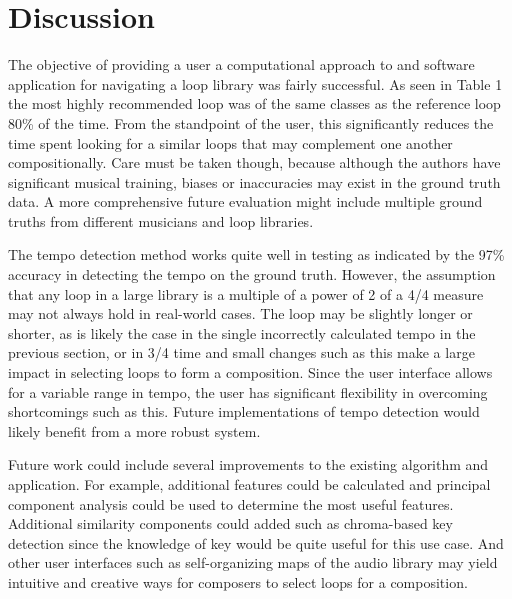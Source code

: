 \documentclass{article}
\begin{document}
\section{Discussion}

The objective of providing a user a computational approach to and software application for navigating a loop library was fairly successful. As seen in Table 1 the most highly recommended loop was of the same classes as the reference loop 80\% of the time. From the standpoint of the user, this significantly reduces the time spent looking for a similar loops that may complement one another compositionally. Care must be taken though, because although the authors have significant musical training, biases or inaccuracies may exist in the ground truth data. A more comprehensive future evaluation might include multiple ground truths from different musicians and loop libraries.

The tempo detection method works quite well in testing as indicated by the 97\% accuracy in detecting the tempo on the ground truth. However, the assumption that any loop in a large library is a multiple of a power of 2 of a 4/4 measure may not always hold in real-world cases. The loop may be slightly longer or shorter, as is likely the case in the single incorrectly calculated tempo in the previous section, or in 3/4 time and small changes such as this make a large impact in selecting loops to form a composition. Since the user interface allows for a variable range in tempo, the user has significant flexibility in overcoming shortcomings such as this. Future implementations of tempo detection would likely benefit from a more robust system.

Future work could include several improvements to the existing algorithm and application. For example, additional features could be calculated and principal component analysis could be used to determine the most useful features. Additional similarity components could added such as chroma-based key detection since the knowledge of key would be quite useful for this use case. And other user interfaces such as self-organizing maps of the audio library may yield intuitive and creative ways for composers to select loops for a composition.



\end{document}
